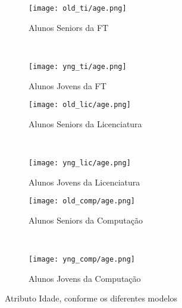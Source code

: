 \clearpage
\begin{figure}[!ht]
    \centering
    \begin{subfigure}[b]{0.48\textwidth}
        \centering
        \texttt{[image: old\_ti/age.png]}
        \caption{Alunos Seniors da FT}
    \end{subfigure}
    ~
    \begin{subfigure}[b]{0.48\textwidth}
        \centering
        \texttt{[image: yng\_ti/age.png]}
        \caption{Alunos Jovens da FT}
    \end{subfigure}

    \begin{subfigure}[b]{0.48\textwidth}
        \centering
        \texttt{[image: old\_lic/age.png]}
        \caption{Alunos Seniors da Licenciatura}
    \end{subfigure}
    ~
    \begin{subfigure}[b]{0.48\textwidth}
        \centering
        \texttt{[image: yng\_lic/age.png]}
        \caption{Alunos Jovens da Licenciatura}
    \end{subfigure}

    \begin{subfigure}[b]{0.48\textwidth}
        \centering
        \texttt{[image: old\_comp/age.png]}
        \caption{Alunos Seniors da Computação}
    \end{subfigure}
    ~
    \begin{subfigure}[b]{0.48\textwidth}
        \centering
        \texttt{[image: yng\_comp/age.png]}
        \caption{Alunos Jovens da Computação}
    \end{subfigure}
    \caption{Atributo Idade, conforme os diferentes modelos}
\end{figure}

